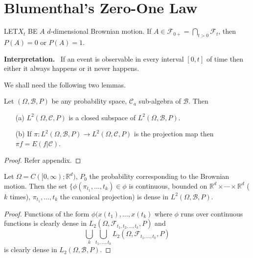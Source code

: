 \chapter{Blumenthal's Zero-One Law}\label{chap8}

LET\pageoriginale $X_{t}$ BE $A$ $d$-dimensional Brownian motion. If
$A\in \mathscr{F}_{0+}=\bigcap\limits_{t>0}\mathscr{F}_{t}$, then
$P(A)=0$ or $P(A)=1$.

\medskip
\noindent
{\bf Interpretation.}~ If an event is observable in every interval
$[0,t]$ of time then either it always happens or it never happens.

We shall need the following two lemmas.

\setcounter{lemma}{0}
\begin{lemma}\label{chap8-lem1}
Let $(\Omega,\mathscr{B},P)$ be any probability space,
$\mathscr{C}_{a}$ sub-algebra of $\mathscr{B}$. Then
\begin{itemize}
\item[\rm(a)] $L^{2}(\Omega,\mathscr{C},P)$ is a closed subspace of
  $L^{2}(\Omega,\mathscr{B},P)$.

\item[\rm(b)] If $\pi:L^{2}(\Omega,\mathscr{B},P)\to
  L^{2}(\Omega,\mathscr{C},P)$ is the projection map then $\pi f
  =E(f|\mathscr{C})$. 
\end{itemize}
\end{lemma}

\begin{proof}
Refer appendix.
\end{proof}

\begin{lemma}\label{chap8-lem2}
Let $\Omega=C([0,\infty);\mathbb{R}^{d})$, $P_{0}$ the probability
  corresponding to the Brownian motion. Then the set
  $\{\phi(\pi_{t_{1}},\ldots,t_{k})\in \phi$ is continuous, bounded on
  $\mathbb{R}^{d}\times\cdots\times \mathbb{R}^{d}$ ($k$ times),
  $\pi_{t_{1}},\ldots,t_{k}$ the canonical projection) is dense in
  $L^{2}(\Omega,\mathscr{B},P)$. 
\end{lemma}

\begin{proof}
Functions of the form $\phi(x(t_{1}),\ldots,x(t_{k})$ where $\phi$
runs over continuous functions is clearly dense in
$L_{2}(\Omega,\mathscr{F}_{t_{1},t_{2},\ldots,t_{k}},P)$ and
$$
\bigcup\limits_{k}\bigcup\limits_{t_{1},\ldots,t_{k}}L_{2}(\Omega,\mathscr{F}_{t_{1},\ldots,t_{k}},P) 
$$
is clearly dense in $L_{2}(\Omega,\mathscr{B},P)$. 
\end{proof}

